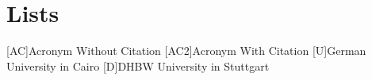 \appendix
\renewcommand{\appendixtocname}{Appendix}
\renewcommand{\appendixpagename}{\appendixtocname}
\addappheadtotoc
{}
\appendixpage

\chapter{Lists}
\begin{acronym}[\hspace{3cm}]
  [AC]{Acronym Without Citation}
  [AC2]{Acronym With Citation \cite{citeKey2}}
  [U]{German University in Cairo}
  [D]{DHBW University in Stuttgart\cite{citeKey2}}
\end{acronym}
\clearpage
\listoffigures
{}
\listoftables
{}
